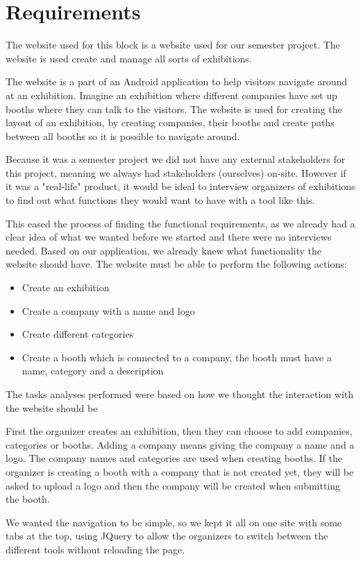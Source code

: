 \section{Requirements}

The website used for this block is a website used for our semester project. The website is used create and manage all sorts of exhibitions. 

The website is a part of an Android application to help visitors navigate around at an exhibition. Imagine an exhibition where different companies have set up booths where they can talk to the visitors. The website is used for creating the layout of an exhibition, by creating companies, their booths and create paths between all booths so it is possible to navigate around. 

Because it was a semester project we did not have any external stakeholders for this project, meaning we always had stakeholders (ourselves) on-site. However if it was a "real-life" product, it would be ideal to interview organizers of exhibitions to find out what functions they would want to have with a tool like this.

This eased the process of finding the functional requirements, as we already had a clear idea of what we wanted before we started and there were no interviews needed. Based on our application, we already knew what functionality the website should have. The website must be able to perform the following actions:

\begin{itemize}[noitemsep]
\item Create an exhibition
\item Create a company with a name and logo
\item Create different categories
\item Create a booth which is connected to a company, the booth must have a name, category and a description
\end{itemize}

The tasks analyses performed were based on how we thought the interaction with the website should be

First the organizer creates an exhibition, then they can choose to add companies, categories or booths. Adding a company means giving the company a name and a logo. The company names and categories are used when creating booths. If the organizer is creating a booth with a company that is not created yet, they will be asked to upload a logo and then the company will be created when submitting the booth.

We wanted the navigation to be simple, so we kept it all on one site with some tabs at the top, using JQuery to allow the organizers to switch between the different tools without reloading the page.